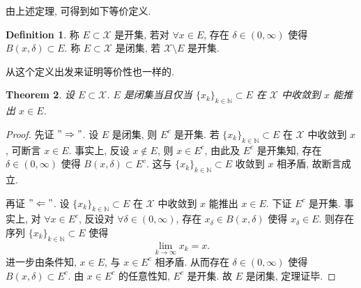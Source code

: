\documentclass[a4paper,11pt]{article}
\newtheorem{theorem}{Theorem}[section]
\theoremstyle{definition}
\newtheorem{definition}[theorem]{Definition}
\begin{document}
由上述定理, 可得到如下等价定义.

\begin{definition} \label{def2}
    称 $ E \subset \mathcal{X} $ 是开集, 若对 $ \forall x \in E $, 
    存在 $ \delta \in (0, \infty) $ 使得 $ B(x, \delta) \subset E $.
    称 $ E \subset \mathcal{X} $ 是闭集, 若 $ \mathcal{X} \setminus E $ 是开集.
\end{definition}

从这个定义出发来证明等价性也一样的.

\begin{theorem}
    设 $ E \subset \mathcal{X} $. $ E $ 是闭集当且仅当 
    $ \{x_k\}_{k \in \mathbb{N}} \subset E $ 在 $ \mathcal{X} $ 中收敛到 $ x $ 能推出 $ x \in E $.
\end{theorem}

\begin{proof}
    先证 $ "\Rightarrow" $. 设 $ E $ 是闭集, 则 $ E^c $ 是开集.
    若 $ \{x_k\}_{k \in \mathbb{N}} \subset E $ 在 $ \mathcal{X} $ 中收敛到 $ x $, 可断言 $ x \in E $.
    事实上, 反设 $ x \notin E $, 则 $ x \in E^c $, 由此及 $ E^c $ 是开集知,
    存在 $ \delta \in (0, \infty) $ 使得 $ B(x, \delta) \subset E^c $.
    这与 $ \{x_k\}_{k \in \mathbb{N}} \subset E $ 收敛到 $ x $ 相矛盾, 故断言成立.
    
    再证 $ "\Leftarrow" $. 
    设 $ \{x_k\}_{k \in \mathbb{N}} \subset E $ 在 $ \mathcal{X} $ 中收敛到 $ x $ 能推出 $ x \in E $.
    下证 $ E^c $ 是开集. 事实上, 对 $ \forall x \in E^c $, 
    反设对 $ \forall \delta \in (0, \infty) $, 存在 $ x_\delta \in B(x, \delta) $ 使得 $ x_\delta \in E $. 
    则存在序列 $ \{x_k\}_{k \in \mathbb{N}} \subset E $ 使得
    $$
        \lim_{k \to \infty} x_k = x.
    $$
    进一步由条件知, $ x \in E $, 与 $ x \in E^c $ 相矛盾. 
    从而存在 $ \delta \in (0, \infty) $ 使得 $ B(x, \delta) \subset E^c $.
    由 $ x \in E^c $ 的任意性知, $ E^c $ 是开集. 故 $ E $ 是闭集, 定理证毕.
\end{proof}
\end{document}
